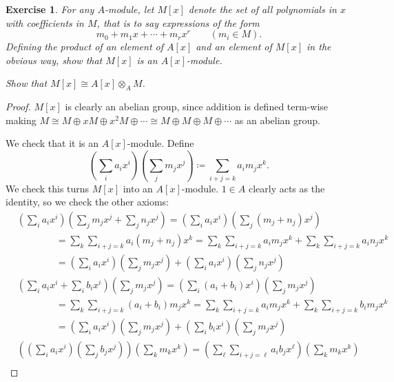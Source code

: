 \documentclass[12pt,letterpaper]{article}
\newtheorem{problem}{Exercise}[section]
\theoremstyle{definition}
\theoremstyle{remark}
\numberwithin{figure}{problem}
\numberwithin{equation}{section}
\begin{document}
\begin{problem}\label{exc:2.6}
  For any
  $A$-module, let
  $M[x]$ denote the set of all polynomials in
  $x$ with coefficients in
  $M$, that is to say expressions of the form
  \begin{equation*}
    m_0 + m_1x + \cdots + m_rx^r \qquad (m_i \in M).
  \end{equation*}
  Defining the product of an element of
  $A[x]$ and an element of
  $M[x]$ in the obvious way, show that
  $M[x]$ is an
  $A[x]$-module.
  \par Show that
  $M[x] \cong A[x] \otimes_A
  M$.
\end{problem}
\begin{proof}
  $M[x]$ is clearly an abelian group, since addition is defined term-wise making
  $M \cong M \oplus xM \oplus x^2M \oplus \cdots \cong M \oplus M \oplus M \oplus
  \cdots$ as an abelian group.
  \par We check that it is an
  $A[x]$-module.
  Define
  \begin{equation*}
    \left( \sum_i a_ix^i \right) \left( \sum_j m_jx^j \right) \coloneqq \sum_{i + j = k} a_im_jx^k.
  \end{equation*}
  We check this turns
  $M[x]$ into an
  $A[x]$-module.
  $1 \in
  A$ clearly acts as the identity, so we check the other axioms:
  \begin{align*}
    &%
    \left( \sum_i a_ix^i \right) \left( \sum_j m_jx^j + \sum_j n_jx^j \right) = \left( \sum_i a_ix^i \right) \left( \sum_j (m_j+n_j)x^j \right)\\
    &%
    \qquad\qquad= \sum_k \sum_{i + j = k} a_i(m_j+n_j)x^k= \sum_k \sum_{i + j = k} a_im_jx^k + \sum_k \sum_{i + j = k} a_in_jx^k\\
    &%
    \qquad\qquad= \left( \sum_i a_ix^i \right) \left( \sum_j m_jx^j \right) + \left( \sum_i a_ix^i \right) \left( \sum_j n_jx^j \right)\\
    &%
    \left( \sum_i a_ix^i + \sum_i b_ix^i \right)\left( \sum_j m_jx^j \right) = \left( \sum_i (a_i+b_i)x^i \right)\left( \sum_j m_jx^j \right)\\
    &%
    \qquad\qquad= \sum_k \sum_{i+j=k} (a_i+b_i)m_jx^k= \sum_k \sum_{i + j = k} a_im_jx^k + \sum_k \sum_{i + j = k} b_im_jx^k\\
    &%
    \qquad\qquad= \left( \sum_i a_ix^i \right)\left( \sum_j m_jx^j \right) + \left( \sum_i b_ix^i \right)\left( \sum_j m_jx^j \right)\\
    &%
    \left(\left( \sum_i a_ix^i\right)\left(\sum_j b_jx^j \right)\right)\left( \sum_k m_kx^k \right) = \left( \sum_\ell \sum_{i+j=\ell} a_ib_jx^\ell \right)\left( \sum_k m_kx^k \right)\\

\end{align*}
\end{proof}
\end{document}
